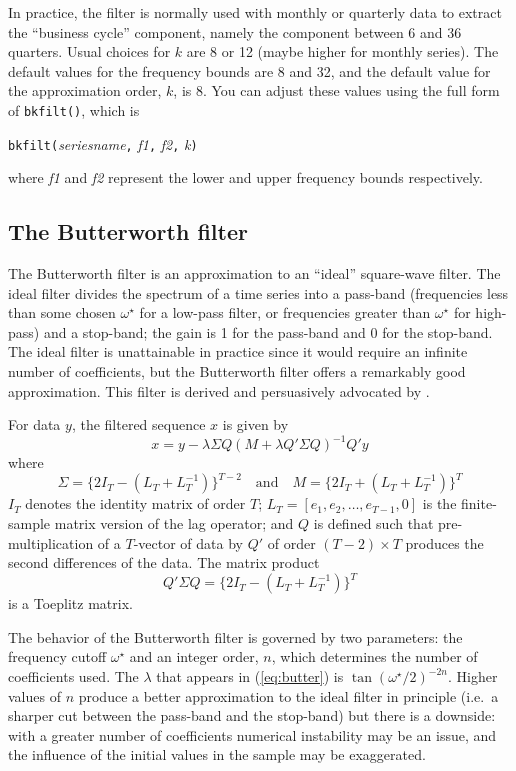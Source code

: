 In practice, the filter is normally used with monthly or quarterly
data to extract the ``business cycle'' component, namely the component
between 6 and 36 quarters. Usual choices for $k$ are 8 or 12 (maybe
higher for monthly series).  The default values for the frequency
bounds are 8 and 32, and the default value for the approximation
order, $k$, is 8. You can adjust these values using the full form
of \verb+bkfilt()+, which is

\texttt{bkfilt(}\textsl{seriesname}\texttt{,} \textsl{f1}\texttt{,} 
 \textsl{f2}\texttt{,} \textsl{k}\texttt{)}

where \textsl{f1} and \textsl{f2} represent the lower and upper
frequency bounds respectively.

\subsection{The Butterworth filter}
\label{sec:butterworth}

The Butterworth filter \citep{butterworth30} is an approximation to an
``ideal'' square-wave filter. The ideal filter divides the spectrum of
a time series into a pass-band (frequencies less than some chosen
$\omega^{\star}$ for a low-pass filter, or frequencies greater than
$\omega^{\star}$ for high-pass) and a stop-band; the gain is 1 for the
pass-band and 0 for the stop-band. The ideal filter is unattainable in
practice since it would require an infinite number of coefficients,
but the Butterworth filter offers a remarkably good
approximation. This filter is derived and persuasively advocated by
\cite{pollock2000}.

For data $y$, the filtered sequence $x$ is given by
%
\begin{equation}
\label{eq:butter}
x = y - \lambda \Sigma Q(M + \lambda Q'\Sigma Q)^{-1}Q'y
\end{equation}
%
where
\[
\Sigma = \{2I_T - (L_T +  L^{-1}_T)\}^{T-2}
\quad \mbox{and} \quad
M =   \{2I_T + (L_T +  L^{-1}_T)\}^{T}
\]
%
$I_T$ denotes the identity matrix of order $T$; $L_T = [e_1, e_2,
\ldots, e_{T-1}, 0]$ is the finite-sample matrix version of the lag
operator; and $Q$ is defined such that pre-multiplication of a
$T$-vector of data by $Q'$ of order $(T-2) \times T$ produces the
second differences of the data. The matrix product
\[
Q'\Sigma Q = \{2I_T - (L_T +  L^{-1}_T)\}^{T}
\]
is a Toeplitz matrix.

The behavior of the Butterworth filter is governed by two parameters:
the frequency cutoff $\omega^{\star}$ and an integer order, $n$, which
determines the number of coefficients used. The $\lambda$ that appears
in (\ref{eq:butter}) is $\tan(\omega^{\star}/2)^{-2n}$.  Higher
values of $n$ produce a better approximation to the ideal filter in
principle (i.e.\ a sharper cut between the pass-band and the
stop-band) but there is a downside: with a greater number of
coefficients numerical instability may be an issue, and the influence
of the initial values in the sample may be exaggerated.

